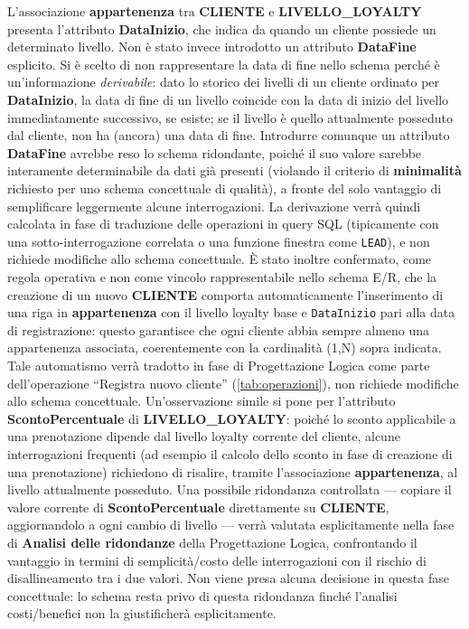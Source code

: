 \documentclass[a4paper,12pt]{report}
\begin{document}
L'associazione \textbf{appartenenza} tra \textbf{CLIENTE} e \textbf{LIVELLO\_LOYALTY} presenta l'attributo \textbf{DataInizio}, che indica da quando un cliente possiede un determinato livello. Non è stato invece introdotto un attributo \textbf{DataFine} esplicito.\medskip
\newline
Si è scelto di non rappresentare la data di fine nello schema perché è un'informazione \textit{derivabile}: dato lo storico dei livelli di un cliente ordinato per \textbf{DataInizio}, la data di fine di un livello coincide con la data di inizio del livello immediatamente successivo, se esiste; se il livello è quello attualmente posseduto dal cliente, non ha (ancora) una data di fine.\medskip
\newline
Introdurre comunque un attributo \textbf{DataFine} avrebbe reso lo schema ridondante, poiché il suo valore sarebbe interamente determinabile da dati già presenti (violando il criterio di \textbf{minimalità} richiesto per uno schema concettuale di qualità), a fronte del solo vantaggio di semplificare leggermente alcune interrogazioni. La derivazione verrà quindi calcolata in fase di traduzione delle operazioni in query SQL (tipicamente con una sotto-interrogazione correlata o una funzione finestra come \texttt{LEAD}), e non richiede modifiche allo schema concettuale.
\newline
È stato inoltre confermato, come regola operativa e non come vincolo
rappresentabile nello schema E/R, che la creazione di un nuovo
\textbf{CLIENTE} comporta automaticamente l'inserimento di una riga in
\textbf{appartenenza} con il livello loyalty base e \texttt{DataInizio}
pari alla data di registrazione: questo garantisce che ogni cliente abbia
sempre almeno una appartenenza associata, coerentemente con la
cardinalità (1,N) sopra indicata. Tale automatismo verrà tradotto in fase
di Progettazione Logica come parte dell'operazione ``Registra nuovo
cliente'' (\cref{tab:operazioni}), non richiede modifiche allo schema
concettuale.
\newline
Un'osservazione simile si pone per l'attributo \textbf{ScontoPercentuale} di \textbf{LIVELLO\_LOYALTY}: poiché lo sconto applicabile a una prenotazione dipende dal livello loyalty corrente del cliente, alcune interrogazioni frequenti (ad esempio il calcolo dello sconto in fase di creazione di una prenotazione) richiedono di risalire, tramite l'associazione \textbf{appartenenza}, al livello attualmente posseduto. Una possibile ridondanza controllata --- copiare il valore corrente di \textbf{ScontoPercentuale} direttamente su \textbf{CLIENTE}, aggiornandolo a ogni cambio di livello --- verrà valutata esplicitamente nella fase di \textbf{Analisi delle ridondanze} della Progettazione Logica, confrontando il vantaggio in termini di semplicità/costo delle interrogazioni con il rischio di disallineamento tra i due valori. Non viene presa alcuna decisione in questa fase concettuale: lo schema resta privo di questa ridondanza finché l'analisi costi/benefici non la giustificherà esplicitamente.
\end{document}
